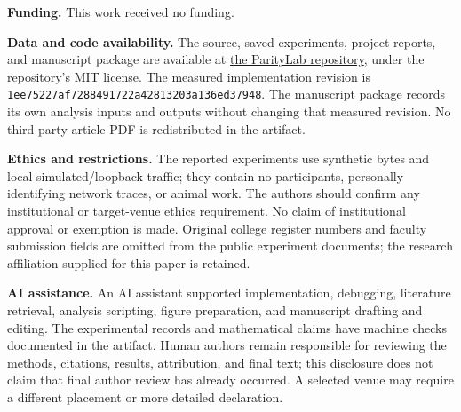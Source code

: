 \documentclass[11pt,a4paper]{article}
\begin{document}
\textbf{Funding.} This work received no funding.

\textbf{Data and code availability.} The source, saved experiments, project reports, and manuscript package are available at \href{https://github.com/aswanth-07/paritylab}{the ParityLab repository}, under the repository's MIT license. The measured implementation revision is \texttt{1ee75227af7288491722a42813203a136ed37948}. The manuscript package records its own analysis inputs and outputs without changing that measured revision. No third-party article PDF is redistributed in the artifact.

\textbf{Ethics and restrictions.} The reported experiments use synthetic bytes and local simulated/loopback traffic; they contain no participants, personally identifying network traces, or animal work. The authors should confirm any institutional or target-venue ethics requirement. No claim of institutional approval or exemption is made. Original college register numbers and faculty submission fields are omitted from the public experiment documents; the research affiliation supplied for this paper is retained.

\textbf{AI assistance.} An AI assistant supported implementation, debugging, literature retrieval, analysis scripting, figure preparation, and manuscript drafting and editing. The experimental records and mathematical claims have machine checks documented in the artifact. Human authors remain responsible for reviewing the methods, citations, results, attribution, and final text; this disclosure does not claim that final author review has already occurred. A selected venue may require a different placement or more detailed declaration.
\end{document}
